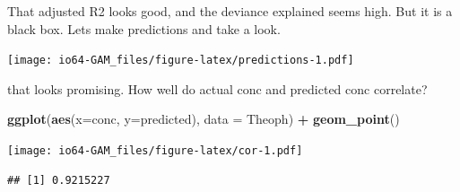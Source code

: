 \documentclass[
]{book}
\newenvironment{Shaded}{\begin{snugshade}}{\end{snugshade}}
\newcommand{\DataTypeTok}[1]{\textcolor[rgb]{0.13,0.29,0.53}{#1}}
\newcommand{\DecValTok}[1]{\textcolor[rgb]{0.00,0.00,0.81}{#1}}
\newcommand{\KeywordTok}[1]{\textcolor[rgb]{0.13,0.29,0.53}{\textbf{#1}}}
\newcommand{\NormalTok}[1]{#1}
\newcommand{\OperatorTok}[1]{\textcolor[rgb]{0.81,0.36,0.00}{\textbf{#1}}}
\newcommand{\StringTok}[1]{\textcolor[rgb]{0.31,0.60,0.02}{#1}}
\begin{document}
That adjusted R2 looks good, and the deviance explained seems high.
But it is a black box.
Lets make predictions and take a look.

\begin{Shaded}
\end{Shaded}

\texttt{[image: io64-GAM\_files/figure-latex/predictions-1.pdf]}

that looks promising.
How well do actual conc and predicted conc correlate?

\begin{Shaded}
\begin{Highlighting}[]
\KeywordTok{ggplot}\NormalTok{(}\KeywordTok{aes}\NormalTok{(}\DataTypeTok{x=}\NormalTok{conc, }\DataTypeTok{y=}\NormalTok{predicted), }\DataTypeTok{data =}\NormalTok{ Theoph) }\OperatorTok{+}\StringTok{ }
\StringTok{  }\KeywordTok{geom_point}\NormalTok{()}
\end{Highlighting}
\end{Shaded}

\texttt{[image: io64-GAM\_files/figure-latex/cor-1.pdf]}

\begin{Shaded}
\end{Shaded}

\begin{verbatim}
## [1] 0.9215227
\end{verbatim}

  
\end{document}
